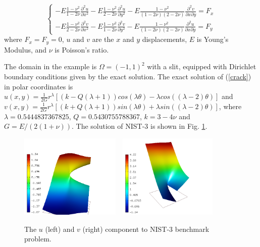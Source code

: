 \documentclass[12pt]{elsarticle}
\begin{document}
\begin{equation}\label{crack}
\left\{
\begin{array}{l}
\displaystyle
-E \frac{1-\nu^2}{1-2\nu} \frac{\partial^{2} u}{\partial x^{2}} - E\frac{1-\nu^2}{2-2 \nu} \frac{\partial^{2} u}{\partial y^{2}}
-E \frac{1-\nu^2}{(1-2\nu)(2-2\nu)} \frac{\partial^{2} v}{\partial x \partial y} = F_{x} \\
\displaystyle
-E \frac{1-\nu^2}{2-2\nu} \frac{\partial^{2} v}{\partial x^{2}} - E\frac{1-\nu^2}{1-2\nu} \frac{\partial^{2} v}{\partial y^{2}}
-E \frac{1-\nu^2}{(1-2\nu)(2-2\nu)} \frac{\partial^{2} u}{\partial x \partial y} = F_{y}
\end{array}
\right.
\end{equation}
where $F_{x} = F_{y} = 0$, $u$ and $v$ are the
$x$ and $y$ displacements, $E$ is Young's Modulus,
and $\nu$ is Poisson's ratio.

The domain in the example is $\Omega = (-1, 1)^2$ with a slit,
equipped with Dirichlet boundary conditions given by the
exact solution. The exact solution of (\ref{crack}) in polar coordinates is
$u(x, y) = \frac{1}{2G} r^{\lambda}[(k - Q(\lambda + 1))cos(\lambda \theta) - \lambda cos((\lambda - 2) \theta)]$ and
$v(x, y) = \frac{1}{2G} r^{\lambda}[(k + Q(\lambda + 1))sin(\lambda \theta) + \lambda sin((\lambda - 2) \theta)]$,
where $\lambda = 0.5444837367825$, $Q = 0.5430755788367$,
$k = 3 - 4 \nu$ and $G = E / (2(1 + \nu))$.
The solution of NIST-3 is shown in Fig. \ref{fig:sln-nist03}.

\begin{figure}[!ht]
\centering
\includegraphics[height=40mm]{nist/nist-3/solution-u.png}\ \
\includegraphics[height=40mm]{nist/nist-3/solution-v.png}
\caption{The $u$ (left) and $v$ (right) component to NIST-3 benchmark problem.}
\label{fig:sln-nist03}
\end{figure}
\end{document}
